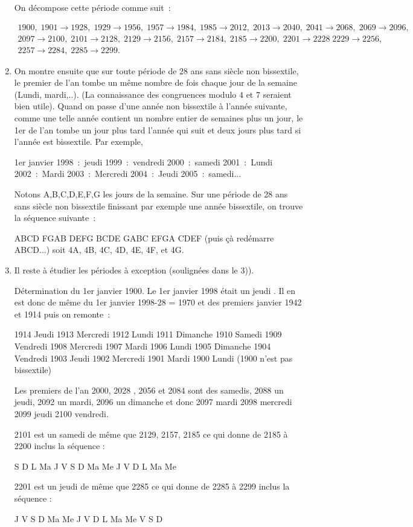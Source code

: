 \documentclass[11pt,a4paper]{article}
\begin{document}
\begin{enumerate}
On décompose cette période comme suit~:

$$\begin{array}{c}
1900,\;1901\rightarrow1928,\;1929\rightarrow1956,\;1957\rightarrow1984,\;1985\rightarrow2012,\;2013\rightarrow2040,\;
2041\rightarrow2068,\;2069\rightarrow2096,\\
2097\rightarrow2100,\;2101\rightarrow2128,\;2129\rightarrow2156,\;2157\rightarrow2184,\;2185\rightarrow2200,\;2201\rightarrow2228\;2229\rightarrow2256,\\
2257\rightarrow2284,\;2285\rightarrow2299.
\end{array}$$

\item  On montre ensuite que sur toute période de $28$ ans sans siècle non bissextile, le premier de l'an tombe un même nombre de fois chaque jour de la semaine (Lundi, mardi,..). (La connaissance des congruences modulo $4$ et $7$ seraient bien utile). Quand on passe d'une année non bissextile à l'année suivante, comme une telle année contient un nombre entier de semaines plus un jour, le 1er de l'an tombe un jour plus tard l'année qui suit et deux jours plus tard si l'année est bissextile. Par exemple,

1er janvier 1998~:~jeudi  1999~:~vendredi  2000~:~samedi  2001~:~Lundi  2002~:~Mardi 2003~:~Mercredi 2004~:~Jeudi 2005~:~samedi...

Notons A,B,C,D,E,F,G les jours de la semaine. Sur une période de 28 ans sans siècle non bissextile finissant par exemple une année bissextile, on trouve la séquence suivante~:

ABCD FGAB DEFG BCDE GABC EFGA CDEF (puis çà redémarre ABCD...) soit 4A, 4B, 4C, 4D, 4E, 4F, et 4G.

\item  Il reste à étudier les périodes à exception (soulignées dans le 3)).

Détermination du 1er janvier 1900.
Le 1er janvier 1998 était un jeudi . Il en est donc de même du 1er janvier 1998-28 = 1970 et des premiers janvier 1942 et 1914 puis on remonte~:

1914 Jeudi 1913 Mercredi 1912 Lundi 1911 Dimanche 1910 Samedi 1909 Vendredi 1908 Mercredi 1907 Mardi
1906 Lundi 1905 Dimanche 1904 Vendredi 1903 Jeudi 1902 Mercredi 1901 Mardi 1900 Lundi (1900 n'est pas bissextile)

Les premiers de l'an 2000, 2028 , 2056 et 2084 sont des samedis, 2088 un jeudi, 2092 un mardi, 2096 un dimanche et donc 2097 mardi 2098 mercredi 2099 jeudi 2100 vendredi.

2101 est un samedi de même que 2129, 2157, 2185 ce qui donne de 2185 à 2200 inclus la séquence :

S D L Ma J V S D Ma Me J V D L Ma Me

2201 est un jeudi de même que 2285 ce qui donne de 2285 à 2299 inclus la séquence :

J V S D Ma Me J V D L Ma Me V S D
\end{enumerate}
\end{document}
